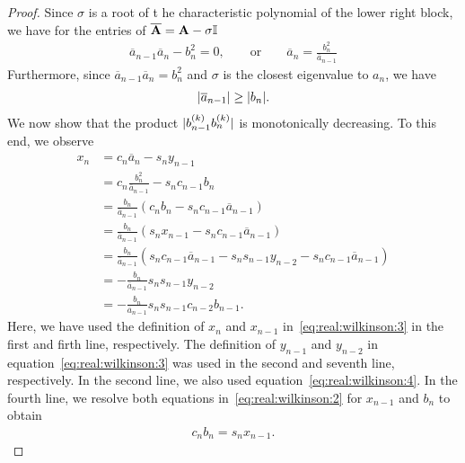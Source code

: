 \begin{proof}
  Since $\sigma$ is a root of t he characteristic polynomial of the
  lower right block, we have for the entries of
  $\overline{\mathbf A} = \mathbf A-\sigma\mathbb I$
  \begin{gather}
    \label{eq:real:wilkinson:4}
    \overline a_{n-1}\overline a_n - b_n^2 = 0,
    \qquad\text{or}\qquad
    \overline a_n = \frac{b_n^2}{\overline a_{n-1}}
  \end{gather}
  Furthermore, since $\overline a_{n-1}\overline a_n = b_n^2$ and
  $\sigma$ is the closest eigenvalue to $a_n$, we have
  \begin{gather}
    \label{eq:real:wilkinson:10}
    \lvert\overline a_{n-1}\rvert \ge \lvert b_n\rvert.
  \end{gather}
  We now show that the product $\lvert b_{n-1}^{(k)}b_{n}^{(k)}\rvert$ is
  monotonically decreasing. To this end, we observe
  \begin{align}
    x_n
    &= c_n \overline a_n - s_n y_{n-1}\\
    &= c_n\frac{b_n^2}{\overline a_{n-1}} - s_n c_{n-1} b_n\\
    &= \frac{b_n}{\overline a_{n-1}}
      \left(c_n b_n - s_n c_{n-1} \overline a_{n-1}\right)\\
    &= \frac{b_n}{\overline a_{n-1}}
      \left(s_n x_{n-1} - s_n c_{n-1} \overline a_{n-1}\right)\\
    &= \frac{b_n}{\overline a_{n-1}}
      \left(s_n c_{n-1} \overline a_{n-1} - s_n s_{n-1}y_{n-2}
      - s_n c_{n-1} \overline a_{n-1}\right)\\
    &= - \frac{b_n}{\overline a_{n-1}} s_n s_{n-1}y_{n-2}\\
    &= - \frac{b_n}{\overline a_{n-1}} s_n s_{n-1} c_{n-2} b_{n-1}.
  \end{align}
  Here, we have used the definition of $x_n$ and $x_{n-1}$
  in~\eqref{eq:real:wilkinson:3} in the first and firth line,
  respectively. The definition of $y_{n-1}$ and $y_{n-2}$ in
  equation~\eqref{eq:real:wilkinson:3} was used in the second and
  seventh line, respectively.  In the second line, we also used
  equation~\eqref{eq:real:wilkinson:4}. In the fourth line, we resolve
  both equations in~\eqref{eq:real:wilkinson:2} for $x_{n-1}$ and
  $b_n$ to obtain
  \begin{gather}
    c_n b_n = s_n x_{n-1}.
  \end{gather}


\end{proof}
